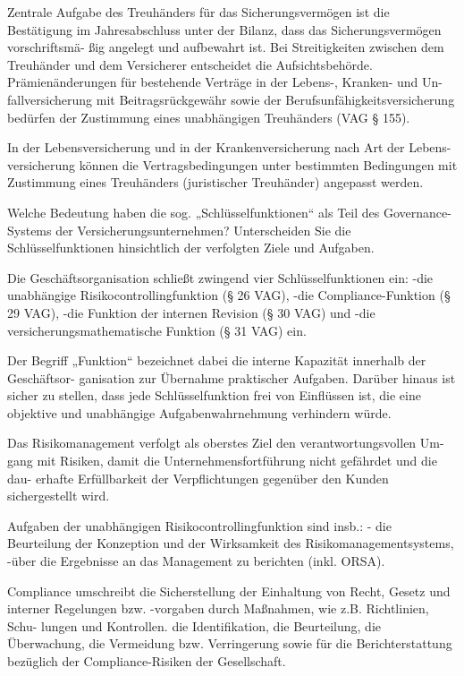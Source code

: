Zentrale Aufgabe des Treuhänders für das Sicherungsvermögen ist die Bestätigung
im Jahresabschluss unter der Bilanz, dass das Sicherungsvermögen vorschriftsmä-
ßig angelegt und aufbewahrt ist. Bei Streitigkeiten zwischen dem Treuhänder und
dem Versicherer entscheidet die Aufsichtsbehörde.
Prämienänderungen für bestehende Verträge in der Lebens-, Kranken- und Un-
fallversicherung mit Beitragsrückgewähr sowie der Berufsunfähigkeitsversicherung
bedürfen der Zustimmung eines unabhängigen Treuhänders (VAG § 155).

In der Lebensversicherung und in der Krankenversicherung nach Art der Lebens-
versicherung können die Vertragsbedingungen unter bestimmten Bedingungen
mit Zustimmung eines Treuhänders (juristischer Treuhänder) angepasst werden.


Welche Bedeutung haben die sog. „Schlüsselfunktionen“ als Teil des
Governance-Systems der Versicherungsunternehmen?
Unterscheiden Sie die Schlüsselfunktionen hinsichtlich der verfolgten
Ziele und Aufgaben.

Die Geschäftsorganisation schließt zwingend vier Schlüsselfunktionen ein:
-die unabhängige Risikocontrollingfunktion (§ 26 VAG),
-die Compliance-Funktion (§ 29 VAG),
-die Funktion der internen Revision (§ 30 VAG) und
-die versicherungsmathematische Funktion (§ 31 VAG) ein.

Der Begriff „Funktion“ bezeichnet dabei die interne Kapazität innerhalb der Geschäftsor-
ganisation zur Übernahme praktischer Aufgaben.
Darüber hinaus ist sicher zu stellen, dass jede Schlüsselfunktion frei von Einflüssen
ist, die eine objektive und unabhängige Aufgabenwahrnehmung verhindern würde.


Das Risikomanagement verfolgt als oberstes Ziel den verantwortungsvollen Um-
gang mit Risiken, damit die Unternehmensfortführung nicht gefährdet und die dau-
erhafte Erfüllbarkeit der Verpflichtungen gegenüber den Kunden sichergestellt
wird.

Aufgaben der unabhängigen Risikocontrollingfunktion sind insb.:
- die Beurteilung der Konzeption und der Wirksamkeit des Risikomanagementsystems,
-über die Ergebnisse an das Management zu berichten (inkl. ORSA).

Compliance umschreibt die Sicherstellung der Einhaltung von Recht, Gesetz und
interner Regelungen bzw. -vorgaben durch Maßnahmen, wie z.B. Richtlinien, Schu-
lungen und Kontrollen.
die Identifikation,
die Beurteilung,
die Überwachung,
die Vermeidung bzw. Verringerung sowie für
die Berichterstattung bezüglich der Compliance-Risiken der Gesellschaft.


